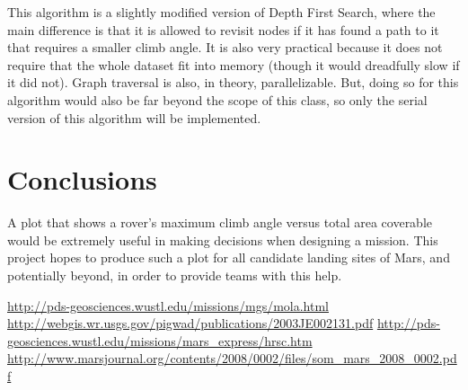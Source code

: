 \documentclass[12pt, twocolumn]{article}
\begin{document}
\par This algorithm is a slightly modified version of Depth First Search, where the main difference is that it is allowed to revisit nodes if it has found a path to it that requires a smaller climb angle. It is also very practical because it does not require that the whole dataset fit into memory (though it would dreadfully slow if it did not). Graph traversal is also, in theory, parallelizable. But, doing so for this algorithm would also be far beyond the scope of this class, so only the serial version of this algorithm will be implemented.

\section{Conclusions}
\label{sec:conclusions}
A plot that shows a rover's maximum climb angle versus total area coverable would be extremely useful in making decisions when designing a mission. This project hopes to produce such a plot for all candidate landing sites of Mars, and potentially beyond, in order to provide teams with this help.

\begin{thebibliography}{1}
\url{http://pds-geosciences.wustl.edu/missions/mgs/mola.html}
\url{http://webgis.wr.usgs.gov/pigwad/publications/2003JE002131.pdf}
\url{http://pds-geosciences.wustl.edu/missions/mars_express/hrsc.htm}
\url{http://www.marsjournal.org/contents/2008/0002/files/som_mars_2008_0002.pdf}
\end{thebibliography}
\end{document}
